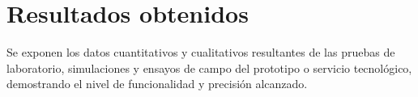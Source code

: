 \section{Resultados obtenidos}
\label{sec:resultados_obtenidos}

Se exponen los datos cuantitativos y cualitativos resultantes de las pruebas de laboratorio, simulaciones y ensayos de campo del prototipo o servicio tecnológico, demostrando el nivel de funcionalidad y precisión alcanzado.
